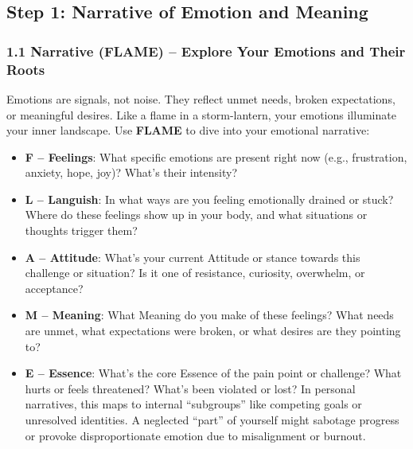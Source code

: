 \documentclass{article}
\begin{document}
\subsection{Step 1: Narrative of Emotion and Meaning}

\subsubsection{1.1 Narrative (FLAME) – Explore Your Emotions and Their Roots}
Emotions are signals, not noise. They reflect unmet needs, broken expectations, or meaningful desires. Like a flame in a storm-lantern, your emotions illuminate your inner landscape. Use \textbf{FLAME} to dive into your emotional narrative:
\begin{itemize}[noitemsep,topsep=0pt]
    \item \textbf{F – Feelings}: What specific emotions are present right now (e.g., frustration, anxiety, hope, joy)? What's their intensity?
    \item \textbf{L – Languish}: In what ways are you feeling emotionally drained or stuck? Where do these feelings show up in your body, and what situations or thoughts trigger them?
    \item \textbf{A – Attitude}: What's your current Attitude or stance towards this challenge or situation? Is it one of resistance, curiosity, overwhelm, or acceptance?
    \item \textbf{M – Meaning}: What Meaning do you make of these feelings? What needs are unmet, what expectations were broken, or what desires are they pointing to?
    \item \textbf{E – Essence}: What's the core Essence of the pain point or challenge? What hurts or feels threatened? What's been violated or lost? In personal narratives, this maps to internal ``subgroups'' like competing goals or unresolved identities. A neglected ``part'' of yourself might sabotage progress or provoke disproportionate emotion due to misalignment or burnout.
\end{itemize}
\end{document}
